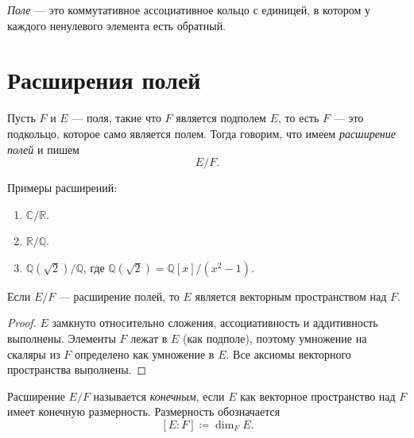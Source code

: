 \begin{definition}
    \emph{Поле} --- это коммутативное ассоциативное кольцо с единицей, в котором у
    каждого ненулевого элемента есть обратный.
\end{definition}

\section{Расширения полей}

\begin{definition}
    Пусть $F$ и $E$ --- поля, такие что $F$ является подполем $E$, то есть $F$ --- это подкольцо,
    которое само является полем. Тогда говорим, что имеем \emph{расширение полей} и пишем
    \[
        E / F.
    \]
\end{definition}

\begin{example}
    Примеры расширений:
    \begin{enumerate}
        \item $\mathbb{C} / \mathbb{R}$.
        \item $\mathbb{R} / \mathbb{Q}$.
        \item $\mathbb{Q}(\sqrt{2}) / \mathbb{Q}$, где $\mathbb{Q}(\sqrt{2}) = \mathbb{Q}[x] / (x^2 - 1)$.
    \end{enumerate}
\end{example}

\begin{stmt}
    Если $E / F$ --- расширение полей, то $E$ является векторным пространством над $F$.

    \begin{proof}
        $E$ замкнуто относительно сложения, ассоциативность и аддитивность выполнены.
        Элементы $F$ лежат в $E$ (как подполе), поэтому умножение на скаляры из $F$ определено
        как умножение в $E$. Все аксиомы векторного пространства выполнены.
    \end{proof}
\end{stmt}

\begin{definition}
    Расширение $E / F$ называется \emph{конечным}, если $E$ как векторное пространство над $F$
    имеет конечную размерность. Размерность обозначается
    \[
        [E : F] \coloneqq \dim_F E.
    \]
\end{definition}

